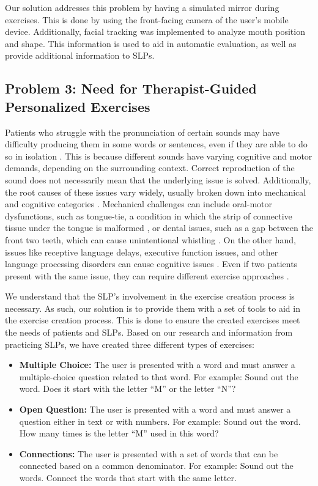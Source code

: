 Our solution addresses this problem by having a simulated mirror during exercises. This is done by using the front-facing camera of the user's mobile device. Additionally, facial tracking was implemented to analyze mouth position and shape. This information is used to aid in automatic evaluation, as well as provide additional information to SLPs.

\subsection{Problem 3: Need for Therapist-Guided Personalized Exercises}

Patients who struggle with the pronunciation of certain sounds may have difficulty producing them in some words or sentences, even if they are able to do so in isolation \cite{asha_ssd_portal}. This is because different sounds have varying cognitive and motor demands, depending on the surrounding context. Correct reproduction of the sound does not necessarily mean that the underlying issue is solved. Additionally, the root causes of these issues vary widely, usually broken down into mechanical and cognitive categories \cite{farquharson2015language}. Mechanical challenges can include oral-motor dysfunctions, such as tongue-tie, a condition in which the strip of connective tissue under the tongue is malformed \cite{melong2024tonguetie}, or dental issues, such as a gap between the front two teeth, which can cause unintentional whistling \cite{digeronimo2021malocclusion}. On the other hand, issues like receptive language delays, executive function issues, and other language processing disorders can cause cognitive issues \cite{farquharson2015language}. Even if two patients present with the same issue, they can require different exercise approaches \cite{farquharson2015language}.

We understand that the SLP's involvement in the exercise creation process is necessary. As such, our solution is to provide them with a set of tools to aid in the exercise creation process. This is done to ensure the created exercises meet the needs of patients and SLPs. Based on our research and information from practicing SLPs, we have created three different types of exercises:

\enlargethispage{2\baselineskip}
\begin{itemize}[nosep]
    \item \textbf{Multiple Choice:} The user is presented with a word and must answer a multiple-choice question related to that word. For example: Sound out the word. Does it start with the letter ``M'' or the letter ``N''?
    \item \textbf{Open Question:} The user is presented with a word and must answer a question either in text or with numbers. For example: Sound out the word. How many times is the letter ``M'' used in this word?
    \item \textbf{Connections:} The user is presented with a set of words that can be connected based on a common denominator. For example: Sound out the words. Connect the words that start with the same letter.
\end{itemize}

